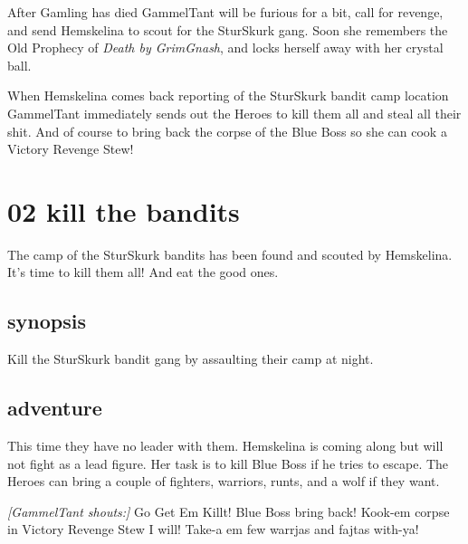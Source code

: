 After Gamling has died GammelTant will be furious for a bit, call for revenge, and send Hemskelina to scout for the SturSkurk gang. Soon she remembers the Old Prophecy of \emph{Death by GrimGnash}, and locks herself away with her crystal ball.

When Hemskelina comes back reporting of the SturSkurk bandit camp location GammelTant immediately sends out the Heroes to kill them all and steal all their shit. And of course to bring back the corpse of the Blue Boss so she can cook a Victory Revenge Stew!










\newpage
\section*{02 kill the bandits}

The camp of the SturSkurk bandits has been found and scouted by Hemskelina. It's time to kill them all! And eat the good ones.


\subsection*{synopsis}

Kill the SturSkurk bandit gang by assaulting their camp at night.


\subsection*{adventure}

This time they have no leader with them. Hemskelina is coming along but will not fight as a lead figure. Her task is to kill Blue Boss if he tries to escape.
The Heroes can bring a couple of fighters, warriors, runts, and a wolf if they want.

\begin{readoutloud}
\emph{[GammelTant shouts:]}
Go Get Em Killt! Blue Boss bring back! Kook-em corpse in Victory Revenge Stew I will! Take-a em few warrjas and fajtas with-ya!
\end{readoutloud}

